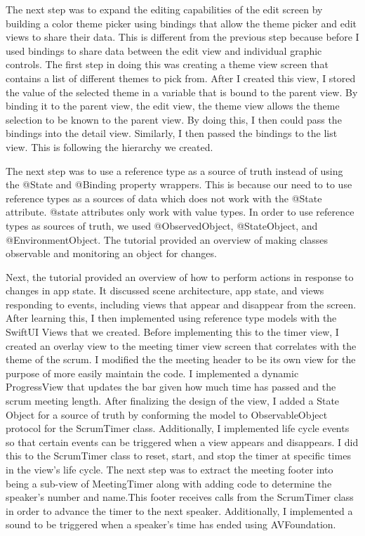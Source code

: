 \documentclass[10pt,twocolumn]{article}
\begin{document}
The next step was to expand the editing capabilities of the edit screen by building a color theme picker using bindings that allow the theme picker and edit views to share their data. This is different from the previous step because before I used bindings to share data between the edit view and individual graphic controls. The first step in doing this was creating a theme view screen that contains a list of different themes to pick from. After I created this view, I stored the value of the selected theme in a variable that is bound to the parent view. By binding it to the parent view, the edit view, the theme view allows the theme selection to be known to the parent view. By doing this, I then could pass the bindings into the detail view. Similarly, I then passed the bindings to the list view. This is following the hierarchy we created.

The next step was to use a reference type as a source of truth instead of using the @State and @Binding property wrappers. This is because our need to to use reference types as a sources of data which does not work with the @State attribute. @state attributes only work with value types. In order to use reference types as sources of truth, we used @ObservedObject, @StateObject, and @EnvironmentObject. The tutorial provided an overview of making classes observable and monitoring an object for changes. 

Next, the tutorial provided an overview of how to perform actions in response to changes in app state. It discussed scene architecture, app state, and views responding to events, including views that appear and disappear from the screen. After learning this, I then implemented using reference type models with the SwiftUI Views that we created. Before implementing this to the timer view,  I created an overlay view to the meeting timer view screen that correlates with the theme of the scrum. I modified the the meeting header to be its own view for the purpose of more easily maintain the code. I implemented a dynamic ProgressView that updates the bar given how much time has passed and the scrum meeting length. After finalizing the design of the view, I added a State Object for a source of truth by conforming the model to ObservableObject protocol for the ScrumTimer class. Additionally, I implemented life cycle events so that certain events can be triggered when a view appears and disappears. I did this to the ScrumTimer class to reset, start, and stop the timer at specific times in the view’s life cycle. The next step was to extract the meeting footer into being a sub-view of MeetingTimer along with adding code to determine the speaker's number and name.This footer receives calls from the ScrumTimer class in order to advance the timer to the next speaker. Additionally, I implemented a sound to be triggered when a speaker's time has ended using AVFoundation. 
\end{document}

